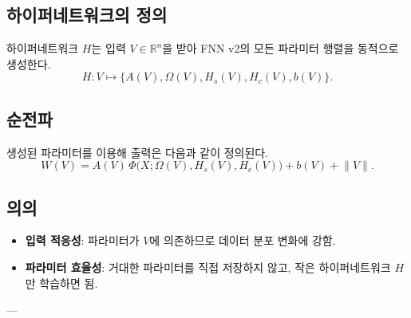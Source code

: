 \documentclass{book}
\begin{document}
\subsection{하이퍼네트워크의 정의}
하이퍼네트워크 $H$는 입력 $V \in \mathbb{R}^n$을 받아
FNN v2의 모든 파라미터 행렬을 동적으로 생성한다.
\[
H: V \mapsto \{A(V), \Omega(V), H_s(V), H_c(V), b(V)\}.
\]

\subsection{순전파}
생성된 파라미터를 이용해 출력은 다음과 같이 정의된다.
\[
W(V) = A(V) \, \Phi\!\big(X; \Omega(V), H_s(V), H_c(V)\big) + b(V) + \lVert V \rVert.
\]

\subsection{의의}
\begin{itemize}
\item \textbf{입력 적응성}: 파라미터가 $V$에 의존하므로 데이터 분포 변화에 강함.
\item \textbf{파라미터 효율성}: 거대한 파라미터를 직접 저장하지 않고, 작은 하이퍼네트워크 $H$만 학습하면 됨.
\end{itemize}

---
\end{document}
